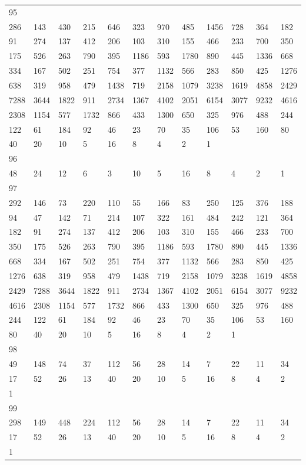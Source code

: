 \begin{longtable}{llllllllllll}
95&&&&&&&&&&&\\
286& 143& 430& 215& 646& 323& 970& 485& 1456& 728& 364& 182\\
91& 274& 137& 412& 206& 103& 310& 155& 466& 233& 700& 350\\
175& 526& 263& 790& 395& 1186& 593& 1780& 890& 445& 1336& 668\\
334& 167& 502& 251& 754& 377& 1132& 566& 283& 850& 425& 1276\\
638& 319& 958& 479& 1438& 719& 2158& 1079& 3238& 1619& 4858& 2429\\
7288& 3644& 1822& 911& 2734& 1367& 4102& 2051& 6154& 3077& 9232& 4616\\
2308& 1154& 577& 1732& 866& 433& 1300& 650& 325& 976& 488& 244\\
122& 61& 184& 92& 46& 23& 70& 35& 106& 53& 160& 80\\
40& 20& 10& 5& 16& 8& 4& 2& 1& \\

96&&&&&&&&&&&\\
48& 24& 12& 6& 3& 10& 5& 16& 8& 4& 2& 1\\

97&&&&&&&&&&&\\
292& 146& 73& 220& 110& 55& 166& 83& 250& 125& 376& 188\\
94& 47& 142& 71& 214& 107& 322& 161& 484& 242& 121& 364\\
182& 91& 274& 137& 412& 206& 103& 310& 155& 466& 233& 700\\
350& 175& 526& 263& 790& 395& 1186& 593& 1780& 890& 445& 1336\\
668& 334& 167& 502& 251& 754& 377& 1132& 566& 283& 850& 425\\
1276& 638& 319& 958& 479& 1438& 719& 2158& 1079& 3238& 1619& 4858\\
2429& 7288& 3644& 1822& 911& 2734& 1367& 4102& 2051& 6154& 3077& 9232\\
4616& 2308& 1154& 577& 1732& 866& 433& 1300& 650& 325& 976& 488\\
244& 122& 61& 184& 92& 46& 23& 70& 35& 106& 53& 160\\
80& 40& 20& 10& 5& 16& 8& 4& 2& 1& \\

98&&&&&&&&&&&\\
49& 148& 74& 37& 112& 56& 28& 14& 7& 22& 11& 34\\
17& 52& 26& 13& 40& 20& 10& 5& 16& 8& 4& 2\\
1& \\

99&&&&&&&&&&&\\
298& 149& 448& 224& 112& 56& 28& 14& 7& 22& 11& 34\\
17& 52& 26& 13& 40& 20& 10& 5& 16& 8& 4& 2\\
1& \\


\end{longtable}
